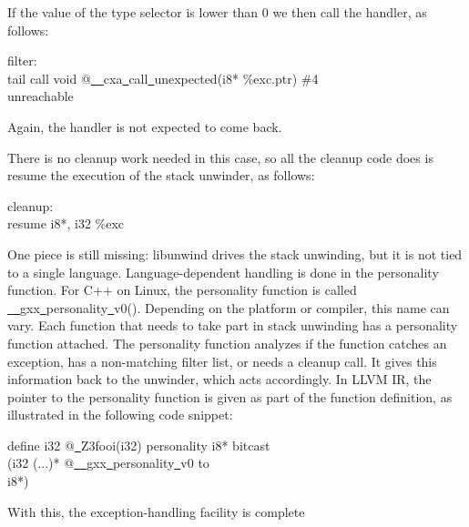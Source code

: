 If the value of the type selector is lower than 0 we then call the handler, as follows:

\begin{tcolorbox}[colback=white,colframe=black]
filter: \\
tail call void @\underline{~~}cxa\underline{~}call\underline{~}unexpected(i8* \%exc.ptr) \#4 \\
unreachable
\end{tcolorbox}

Again, the handler is not expected to come back.\par

There is no cleanup work needed in this case, so all the cleanup code does is resume the execution of the stack unwinder, as follows:\par

\begin{tcolorbox}[colback=white,colframe=black]
cleanup: \\
resume { i8*, i32 } \%exc
\end{tcolorbox}

One piece is still missing: libunwind drives the stack unwinding, but it is not tied to a single language. Language-dependent handling is done in the personality function. For C++ on Linux, the personality function is called \underline{~~}gxx\underline{~}personality\underline{~}v0(). Depending on the platform or compiler, this name can vary. Each function that needs to take part in stack unwinding has a personality function attached. The personality function analyzes if the function catches an exception, has a non-matching filter list, or needs a cleanup call. It gives this information back to the unwinder, which acts accordingly. In LLVM IR, the pointer to the personality function is given as part of the function definition, as illustrated in the following code snippet:\par

\begin{tcolorbox}[colback=white,colframe=black]
define i32 @\underline{~}Z3fooi(i32) personality i8* bitcast \\
\hspace*{3cm}(i32 (...)* @\underline{~~}gxx\underline{~}personality\underline{~}v0 to \\
\hspace*{3cm}i8*)
\end{tcolorbox}

With this, the exception-handling facility is complete\par

